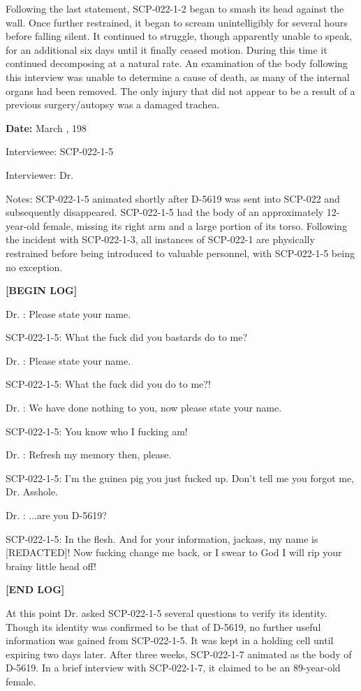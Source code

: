 Following the last statement, SCP-022-1-2 began to smash its head against the wall. Once further restrained, it began to scream unintelligibly for several hours before falling silent. It continued to struggle, though apparently unable to speak, for an additional six days until it finally ceased motion. During this time it continued decomposing at a natural rate. An examination of the body following this interview was unable to determine a cause of death, as many of the internal organs had been removed. The only injury that did not appear to be a result of a previous surgery/autopsy was a damaged trachea.

\textbf{Date:} March , 198

Interviewee: SCP-022-1-5

Interviewer: Dr. 

Notes: SCP-022-1-5 animated shortly after D-5619 was sent into SCP-022 and subsequently disappeared. SCP-022-1-5 had the body of an approximately 12-year-old female, missing its right arm and a large portion of its torso. Following the incident with SCP-022-1-3, all instances of SCP-022-1 are physically restrained before being introduced to valuable personnel, with SCP-022-1-5 being no exception.

\begin{leftbar}
\begin{flushleft}
\textbf{[BEGIN LOG]}

Dr. : Please state your name.

SCP-022-1-5: What the fuck did you bastards do to me?

Dr. : Please state your name.

SCP-022-1-5: What the fuck did you do to me?!

Dr. : We have done nothing to you, now please state your name.

SCP-022-1-5: You know who I fucking am!

Dr. : Refresh my memory then, please.

SCP-022-1-5: I'm the guinea pig you just fucked up. Don't tell me you forgot me, Dr. Asshole.

Dr. : ...are you D-5619?

SCP-022-1-5: In the flesh. And for your information, jackass, my name is [REDACTED]! Now fucking change me back, or I swear to God I will rip your brainy little head off!

\textbf{[END LOG]}
\end{flushleft}
\end{leftbar}

At this point Dr.  asked SCP-022-1-5 several questions to verify its identity. Though its identity was confirmed to be that of D-5619, no further useful information was gained from SCP-022-1-5. It was kept in a holding cell until expiring two days later. After three weeks, SCP-022-1-7 animated as the body of D-5619. In a brief interview with SCP-022-1-7, it claimed to be an 89-year-old female.
